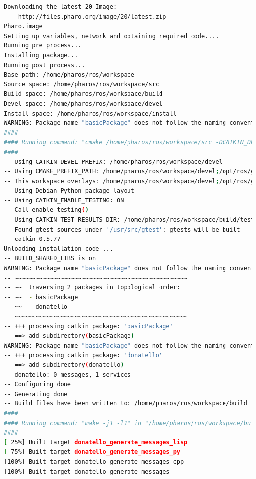 \documentclass[a4paper,10pt,twoside]{book}
\begin{document}
\begin{lstlisting}[language=bash,title={ Default package creation - output}]
Downloading the latest 20 Image:
    http://files.pharo.org/image/20/latest.zip
Pharo.image
Setting up variables, network and obtaining required code....
Running pre process...  
Installing package... 
Running post process... 
Base path: /home/pharos/ros/workspace
Source space: /home/pharos/ros/workspace/src
Build space: /home/pharos/ros/workspace/build
Devel space: /home/pharos/ros/workspace/devel
Install space: /home/pharos/ros/workspace/install
WARNING: Package name "basicPackage" does not follow the naming conventions. It should start with a lower case letter and only contain lower case letters, digits and underscores.
####
#### Running command: "cmake /home/pharos/ros/workspace/src -DCATKIN_DEVEL_PREFIX=/home/pharos/ros/workspace/devel -DCMAKE_INSTALL_PREFIX=/home/pharos/ros/workspace/install" in "/home/pharos/ros/workspace/build"
####
-- Using CATKIN_DEVEL_PREFIX: /home/pharos/ros/workspace/devel
-- Using CMAKE_PREFIX_PATH: /home/pharos/ros/workspace/devel;/opt/ros/groovy
-- This workspace overlays: /home/pharos/ros/workspace/devel;/opt/ros/groovy
-- Using Debian Python package layout
-- Using CATKIN_ENABLE_TESTING: ON
-- Call enable_testing()
-- Using CATKIN_TEST_RESULTS_DIR: /home/pharos/ros/workspace/build/test_results
-- Found gtest sources under '/usr/src/gtest': gtests will be built
-- catkin 0.5.77
Unloading installation code ... 
-- BUILD_SHARED_LIBS is on
WARNING: Package name "basicPackage" does not follow the naming conventions. It should start with a lower case letter and only contain lower case letters, digits and underscores.
-- ~~~~~~~~~~~~~~~~~~~~~~~~~~~~~~~~~~~~~~~~~~~~~~~~~
-- ~~  traversing 2 packages in topological order:
-- ~~  - basicPackage
-- ~~  - donatello
-- ~~~~~~~~~~~~~~~~~~~~~~~~~~~~~~~~~~~~~~~~~~~~~~~~~
-- +++ processing catkin package: 'basicPackage'
-- ==> add_subdirectory(basicPackage)
WARNING: Package name "basicPackage" does not follow the naming conventions. It should start with a lower case letter and only contain lower case letters, digits and underscores.
-- +++ processing catkin package: 'donatello'
-- ==> add_subdirectory(donatello)
-- donatello: 0 messages, 1 services
-- Configuring done
-- Generating done
-- Build files have been written to: /home/pharos/ros/workspace/build
####
#### Running command: "make -j1 -l1" in "/home/pharos/ros/workspace/build"
####
[ 25%] Built target donatello_generate_messages_lisp
[ 75%] Built target donatello_generate_messages_py
[100%] Built target donatello_generate_messages_cpp
[100%] Built target donatello_generate_messages

				\end{lstlisting} 
				
\end{document}

